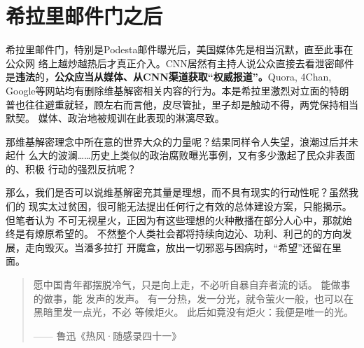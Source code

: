\section{希拉里邮件门之后}

希拉里邮件门，特别是Podesta邮件曝光后，美国媒体先是相当沉默，直至此事在公众网
络上越炒越热后才真正介入。CNN居然有主持人说公众直接去看泄密邮件
是\textbf{违法}的，\textbf{公众应当从媒体、从CNN渠道获取“权威报道”。}Quora,
4Chan, Google等网站均有删除维基解密相关内容的行为。本是希拉里激烈对立面的特朗
普也往往避重就轻，顾左右而言他，皮尽管扯，里子却是触动不得，两党保持相当默契。
媒体、政治地被规训在此表现的淋漓尽致。

那维基解密理念中所在意的世界大众的力量呢？结果同样令人失望，浪潮过后并未起什
么大的波澜……历史上类似的政治腐败曝光事例，又有多少激起了民众非表面的、积极
行动的强烈反抗呢？

那么，我们是否可以说维基解密充其量是理想，而不具有现实的行动性呢？虽然我们的
现实太过贫困，很可能无法提出任何行之有效的总体建设方案，只能揭示。但笔者认为
不可无视星火，正因为有这些理想的火种散播在部分人心中，那就始终是有燎原希望的。
不然整个人类社会都将持续向边沁、功利、利己的的方向发展，走向毁灭。当潘多拉打
开魔盒，放出一切邪恶与困病时，“希望”还留在里面。

\begin{quotation}
  愿中国青年都摆脱冷气，只是向上走，不必听自暴自弃者流的话。 能做事的做事，能
  发声的发声。 有一分热，发一分光，就令萤火一般，也可以在黑暗里发一点光，不必
  等候炬火。 此后如竟没有炬火：我便是唯一的光。

  \raggedleft
  —— 鲁迅\quad 《热风·随感录四十一》 \qquad
\end{quotation}
